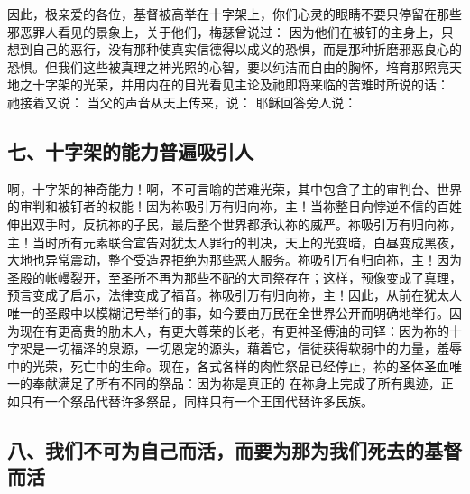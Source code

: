 因此，极亲爱的各位，基督被高举在十字架上，你们心灵的眼睛不要只停留在那些邪恶罪人看见的景象上，关于他们，梅瑟曾说过： 因为他们在被钉的主身上，只想到自己的恶行，没有那种使真实信德得以成义的恐惧，而是那种折磨邪恶良心的恐惧。但我们这些被真理之神光照的心智，要以纯洁而自由的胸怀，培育那照亮天地之十字架的光荣，并用内在的目光看见主论及祂即将来临的苦难时所说的话： 祂接着又说： 当父的声音从天上传来，说： 耶稣回答旁人说：\par


\subsection{七、十字架的能力普遍吸引人}

啊，十字架的神奇能力！啊，不可言喻的苦难光荣，其中包含了主的审判台、世界的审判和被钉者的权能！因为祢吸引万有归向祢，主！当祢整日向悖逆不信的百姓伸出双手时，反抗祢的子民，最后整个世界都承认祢的威严。祢吸引万有归向祢，主！当时所有元素联合宣告对犹太人罪行的判决，天上的光变暗，白昼变成黑夜，大地也异常震动，整个受造界拒绝为那些恶人服务。祢吸引万有归向祢，主！因为圣殿的帐幔裂开，至圣所不再为那些不配的大司祭存在；这样，预像变成了真理，预言变成了启示，法律变成了福音。祢吸引万有归向祢，主！因此，从前在犹太人唯一的圣殿中以模糊记号举行的事，如今要由万民在全世界公开而明确地举行。因为现在有更高贵的肋未人，有更大尊荣的长老，有更神圣傅油的司铎：因为祢的十字架是一切福泽的泉源，一切恩宠的源头，藉着它，信徒获得软弱中的力量，羞辱中的光荣，死亡中的生命。现在，各式各样的肉性祭品已经停止，祢的圣体圣血唯一的奉献满足了所有不同的祭品：因为祢是真正的 在祢身上完成了所有奥迹，正如只有一个祭品代替许多祭品，同样只有一个王国代替许多民族。\par


\subsection{八、我们不可为自己而活，而要为那为我们死去的基督而活}

